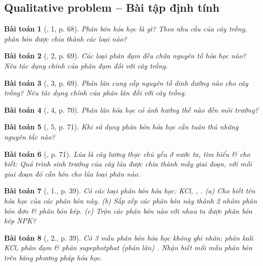 \documentclass{article}
\newtheorem{baitoan}{Bài toán}
\begin{document}
\subsection{Qualitative problem -- Bài tập định tính}

\begin{baitoan}[\cite{SGK_KHTN_8_Canh_Dieu}, 1, p. 68]
	Phân bón hóa học là gì? Theo nhu cầu của cây trồng, phân bón được chia thành các loại nào?
\end{baitoan}

\begin{baitoan}[\cite{SGK_KHTN_8_Canh_Dieu}, 2, p. 69]
	Các loại phân đạm đều chứa nguyên tố hóa học nào? Nêu tác dụng chính của phân đạm đối với cây trồng.
\end{baitoan}

\begin{baitoan}[\cite{SGK_KHTN_8_Canh_Dieu}, 3, p. 69]
	Phân lân cung cấp nguyên tố dinh dưỡng nào cho cây trồng? Nêu tác dụng chính của phân lân đối với cây trồng.
\end{baitoan}

\begin{baitoan}[\cite{SGK_KHTN_8_Canh_Dieu}, 4, p. 70]
	Phân lân hóa học có ảnh hưởng thế nào đến môi trường?
\end{baitoan}

\begin{baitoan}[\cite{SGK_KHTN_8_Canh_Dieu}, 5, p. 71]
	Khi sử dụng phân bón hóa học cần tuân thủ những nguyên tắc nào?
\end{baitoan}

\begin{baitoan}[\cite{SGK_KHTN_8_Canh_Dieu}, p. 71]
	Lúa là cây lương thực chủ yếu ở nước ta, tìm hiểu \& cho biết: Quá trình sinh trưởng của cây lúa được chia thành mấy giai đoạn, với mỗi giai đoạn đó cần bón cho lúa loại phân nào.
\end{baitoan}

\begin{baitoan}[\cite{SGK_Hoa_Hoc_9}, 1., p. 39]
	Có các loại phân bón hóa học: \emph{KCl, , }. (a) Cho biết tên hóa học của các phân bón này. (b) Sắp xếp các phân bón này thành 2 nhóm phân bón đơn \& phân bón kép. (c) Trộn các phân bón nào với nhau ta được phân bón kép NPK?
\end{baitoan}

\begin{baitoan}[\cite{SGK_Hoa_Hoc_9}, 2., p. 39]
	Có 3 mẫu phân bón hóa học không ghi nhãn: phân kali \emph{KCl}, phân đạm \emph{} \& phân supephotphat (phân lân) \emph{}. Nhận biết mỗi mẫu phân bón trên băng phương pháp hóa học.
\end{baitoan}
\end{document}
